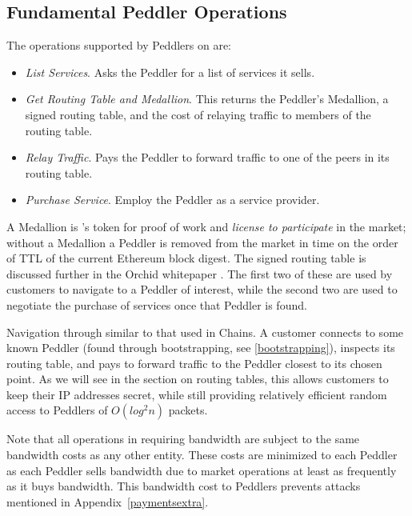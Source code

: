 \subsection{Fundamental Peddler Operations}

The operations supported by Peddlers on \tOM{} are:

\begin{itemize}
\item \emph{List Services}. Asks the Peddler for a list of services it sells.
\item \emph{Get Routing Table and Medallion}. This returns the Peddler's Medallion, a signed routing table, and the cost of relaying traffic to members of the routing table.
\item \emph{Relay Traffic}. Pays the Peddler to forward traffic to one of the peers in its routing table.
\item \emph{Purchase Service}. Employ the Peddler as a service provider.
\end{itemize}

A Medallion is \TOM{}'s token for proof of work and \textit{license to participate} in the market; without a Medallion a Peddler is removed from the market in time on the order of TTL of the current Ethereum block digest. The signed routing table 
is discussed further in the Orchid whitepaper \cite{orchid}.%
The first two of these are used by customers to navigate to a Peddler of interest, while the second two are used to negotiate the purchase of services once that Peddler is found.

{Navigation through \tOM{} similar to that used in Chains. A customer connects to some known Peddler (found through
bootstrapping, see \ref{bootstrapping}), inspects its routing table, and pays to forward traffic to the Peddler closest to its chosen point. As we will see in the section on routing tables, this allows customers to keep their IP addresses secret, while still providing relatively efficient random access to Peddlers of $O(log^2 n)$ packets.}

Note that all operations in \TOM{} requiring bandwidth are subject to the same bandwidth costs as any other entity. These costs are minimized to each Peddler as each Peddler sells bandwidth due to market operations at least as frequently as it buys bandwidth. This bandwidth cost to Peddlers prevents attacks mentioned in Appendix~\ref{paymentsextra}.


